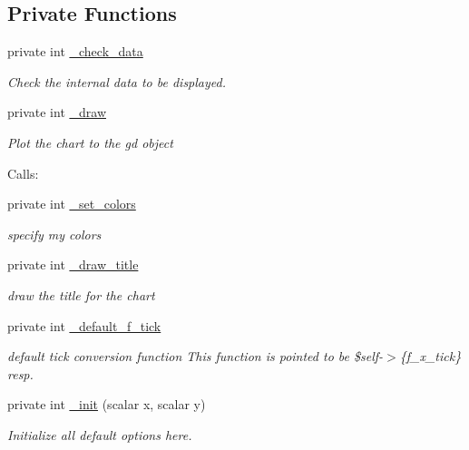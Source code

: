 \subsection*{Private Functions}
\label{_amgrp8d29cff216bafa3117e21883ea7c6b5f}
 \begin{DoxyCompactItemize}
\item 
private int \hyperlink{classChart_1_1Base_a13296be5b92a9880851977fe0abfdf01}{\_\-check\_\-data}
\begin{DoxyCompactList}\small\item\em Check the internal data to be displayed. \item\end{DoxyCompactList}\item 
private int \hyperlink{classChart_1_1Base_ab021c0dceb1ae55e1697bbee667480fa}{\_\-draw}
\begin{DoxyCompactList}\small\item\em Plot the chart to the gd object\par
 Calls: \item\end{DoxyCompactList}\item 
private int \hyperlink{classChart_1_1Base_addecc110eb46a126acaad69e113d06ea}{\_\-set\_\-colors}
\begin{DoxyCompactList}\small\item\em specify my colors \item\end{DoxyCompactList}\item 
private int \hyperlink{classChart_1_1Base_aa3467472a4c4a598c5a2f64de8c438c1}{\_\-draw\_\-title}
\begin{DoxyCompactList}\small\item\em draw the title for the chart \item\end{DoxyCompactList}\item 
private int \hyperlink{classChart_1_1Base_a060d522a2f0240cad4c746891d488f80}{\_\-default\_\-f\_\-tick}
\begin{DoxyCompactList}\small\item\em default tick conversion function This function is pointed to be \$self-\/$>$\{f\_\-x\_\-tick\} resp. \item\end{DoxyCompactList}\item 
private int \hyperlink{classChart_1_1Base_a0803aa94dabfc982195cab15392ba7bc}{\_\-init} (scalar x, scalar y)
\begin{DoxyCompactList}\small\item\em Initialize all default options here. \item\end{DoxyCompactList}\item 

\end{DoxyCompactItemize}
